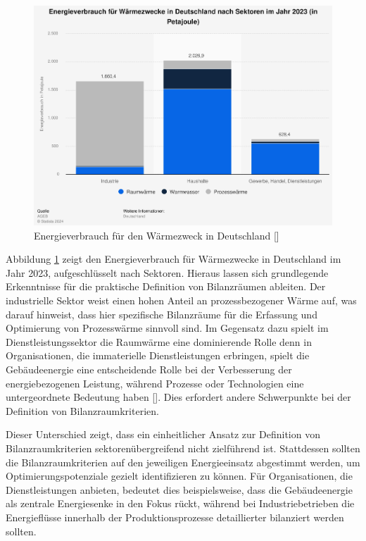 \begin{figure}[H]
    \centering
    \includegraphics[width=1\textwidth]{../../Ressourcen/Bilder/Energieverbrauch_für_Wärmezweck_DE.jpg}
    \caption{Energieverbrauch für den Wärmezweck in Deutschland [\cite{AGEB.2024}]}
    \label{fig:Energieverbrauch_Wärme_DE}
\end{figure}

Abbildung \ref{fig:Energieverbrauch_Wärme_DE} zeigt den Energieverbrauch für Wärmezwecke in Deutschland im Jahr 2023, aufgeschlüsselt nach Sektoren. Hieraus lassen sich grundlegende Erkenntnisse für die 
praktische Definition von Bilanzräumen ableiten. Der industrielle Sektor weist einen hohen Anteil an prozessbezogener Wärme auf, was darauf hinweist, dass hier spezifische Bilanzräume für die Erfassung und 
Optimierung von Prozesswärme sinnvoll sind. Im Gegensatz dazu spielt im Dienstleistungssektor die Raumwärme eine dominierende Rolle denn in Organisationen, die immaterielle Dienstleistungen 
erbringen, spielt die Gebäudeenergie eine entscheidende Rolle bei der Verbesserung der energiebezogenen Leistung, während Prozesse oder Technologien eine untergeordnete Bedeutung haben [\cite{AlbertoFichera.2020}]. 
Dies erfordert andere Schwerpunkte bei der Definition von Bilanzraumkriterien.

Dieser Unterschied zeigt, dass ein einheitlicher Ansatz zur Definition von Bilanzraumkriterien sektorenübergreifend nicht zielführend ist. Stattdessen sollten die Bilanzraumkriterien auf den jeweiligen Energieeinsatz 
abgestimmt werden, um Optimierungspotenziale gezielt identifizieren zu können. Für Organisationen, die Dienstleistungen anbieten, bedeutet dies beispielsweise, dass die Gebäudeenergie als zentrale Energiesenke 
in den Fokus rückt, während bei Industriebetrieben die Energieflüsse innerhalb der Produktionsprozesse detaillierter bilanziert werden sollten.

